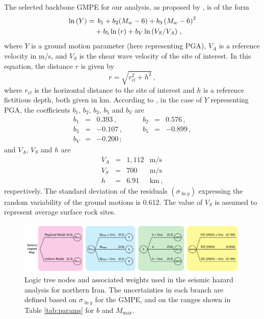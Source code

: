 The selected backbone GMPE for our analysis, as proposed by \citet{Kalkan2004}, is of the form
%
\begin{align}
	\ln \left( Y \right) =
		& \hspace{1ex} b_1 + b_2(M_w - 6) + b_3 \left( M_w - 6 \right)^{2} \nonumber \\
		& + b_5 \ln \left( r \right) + b_V \ln \left( V_S / V_A \right)
	\, ,
\end{align}
%
where $Y$ is a ground motion parameter (here representing PGA), $V_A$ is a reference velocity in m/s, and $V_S$ is the shear wave velocity of the site of interest. In this equation, the distance $r$ is given by
%
\begin{equation}
	r= \sqrt{ r^2_{\mathit{cl}} + h^2 }
	\, ,
\end{equation}
%
where $r_{\mathit{cl}}$ is the horizontal distance to the site of interest and $h$ is a reference fictitious depth, both given in km.  According to \citet{Kalkan2004}, in the case of $Y$ representing PGA, the coefficients $b_1$, $b_2$, $b_3$, $b_5$ and $b_V$ are
%
\begin{equation}
\begin{array}{lcrlcr}
	b_1 &=&  0.393   \,,&\hspace{2em}   b_2 &=& 0.576\,,   \\
	b_3 &=& -0.107   \,,&\hspace{2em}   b_5 &=& -0.899\,,  \\
	b_V &=& -0.200   \,;
	\nonumber
\end{array}
\end{equation}
%
and $V_A$, $V_S$ and $h$ are
%
\begin{equation}
\begin{array}{lcrl}
	V_A &=& 1,112 & \mathrm{m/s}	\\
	V_S &=&   700 & \mathrm{m/s}	\\
	h   &=&  6.91 & \mathrm{km}\,,
	\nonumber
\end{array}
\end{equation}
%
respectively. The standard deviation of the residuals $(\sigma_{\ln y})$ expressing the random variability of the ground motions is 0.612. The value of $V_S$ is assumed to represent average surface rock sites.

\begin{figure}[t]
    \centering
    \includegraphics[width=\textwidth]{figures/pdf/figure-09}
    \caption{Logic tree nodes and associated weights used in the seismic hazard analysis for northern Iran. The uncertainties in each branch are defined based on $\sigma_{\ln y}$ for the GMPE, and on the ranges shown in Table \ref{tab:params} for $b$ and $M_{\max}$.}
    \label{fig:logic}
\end{figure}

